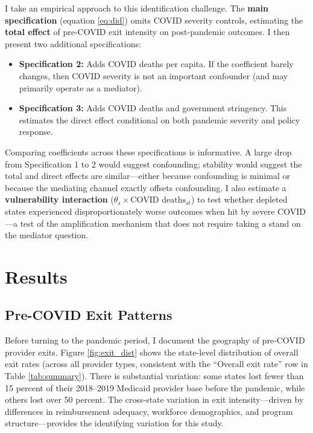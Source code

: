 \documentclass[12pt]{article}
\begin{document}
I take an empirical approach to this identification challenge. The \textbf{main specification} (equation \ref{eq:did}) omits COVID severity controls, estimating the \textbf{total effect} of pre-COVID exit intensity on post-pandemic outcomes. I then present two additional specifications:
\begin{itemize}
\item \textbf{Specification 2:} Adds COVID deaths per capita. If the coefficient barely changes, then COVID severity is not an important confounder (and may primarily operate as a mediator).
\item \textbf{Specification 3:} Adds COVID deaths and government stringency. This estimates the direct effect conditional on both pandemic severity and policy response.
\end{itemize}

Comparing coefficients across these specifications is informative. A large drop from Specification 1 to 2 would suggest confounding; stability would suggest the total and direct effects are similar---either because confounding is minimal or because the mediating channel exactly offsets confounding. I also estimate a \textbf{vulnerability interaction} ($\theta_s \times \text{COVID deaths}_{st}$) to test whether depleted states experienced disproportionately worse outcomes when hit by severe COVID---a test of the amplification mechanism that does not require taking a stand on the mediator question.


\section{Results}

\subsection{Pre-COVID Exit Patterns}

Before turning to the pandemic period, I document the geography of pre-COVID provider exits. Figure \ref{fig:exit_dist} shows the state-level distribution of overall exit rates (across all provider types, consistent with the ``Overall exit rate'' row in Table \ref{tab:summary}). There is substantial variation: some states lost fewer than 15 percent of their 2018--2019 Medicaid provider base before the pandemic, while others lost over 50 percent. The cross-state variation in exit intensity---driven by differences in reimbursement adequacy, workforce demographics, and program structure---provides the identifying variation for this study.
\end{document}

